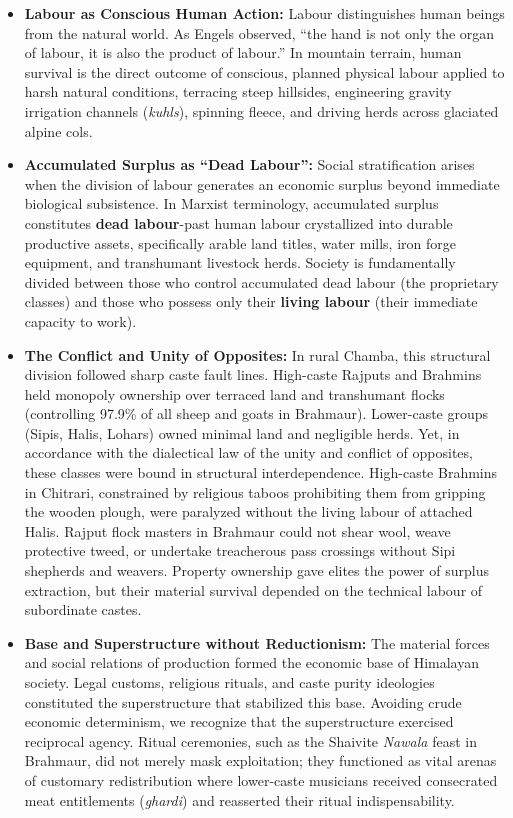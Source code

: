 \documentclass[11pt,a4paper]{article}
\begin{document}
\begin{itemize}[leftmargin=*]
    \item \textbf{Labour as Conscious Human Action:} Labour distinguishes human beings from the natural world. As Engels observed, ``the hand is not only the organ of labour, it is also the product of labour.'' In mountain terrain, human survival is the direct outcome of conscious, planned physical labour applied to harsh natural conditions, terracing steep hillsides, engineering gravity irrigation channels (\textit{kuhls}), spinning fleece, and driving herds across glaciated alpine cols.
    \item \textbf{Accumulated Surplus as ``Dead Labour'':} Social stratification arises when the division of labour generates an economic surplus beyond immediate biological subsistence. In Marxist terminology, accumulated surplus constitutes \textbf{dead labour}-past human labour crystallized into durable productive assets, specifically arable land titles, water mills, iron forge equipment, and transhumant livestock herds. Society is fundamentally divided between those who control accumulated dead labour (the proprietary classes) and those who possess only their \textbf{living labour} (their immediate capacity to work).
    \item \textbf{The Conflict and Unity of Opposites:} In rural Chamba, this structural division followed sharp caste fault lines. High-caste Rajputs and Brahmins held monopoly ownership over terraced land and transhumant flocks (controlling 97.9\% of all sheep and goats in Brahmaur). Lower-caste groups (Sipis, Halis, Lohars) owned minimal land and negligible herds. Yet, in accordance with the dialectical law of the unity and conflict of opposites, these classes were bound in structural interdependence. High-caste Brahmins in Chitrari, constrained by religious taboos prohibiting them from gripping the wooden plough, were paralyzed without the living labour of attached Halis. Rajput flock masters in Brahmaur could not shear wool, weave protective tweed, or undertake treacherous pass crossings without Sipi shepherds and weavers. Property ownership gave elites the power of surplus extraction, but their material survival depended on the technical labour of subordinate castes.
    \item \textbf{Base and Superstructure without Reductionism:} The material forces and social relations of production formed the economic base of Himalayan society. Legal customs, religious rituals, and caste purity ideologies constituted the superstructure that stabilized this base. Avoiding crude economic determinism, we recognize that the superstructure exercised reciprocal agency. Ritual ceremonies, such as the Shaivite \textit{Nawala} feast in Brahmaur, did not merely mask exploitation; they functioned as vital arenas of customary redistribution where lower-caste musicians received consecrated meat entitlements (\textit{ghardi}) and reasserted their ritual indispensability.
\end{itemize}
\end{document}
